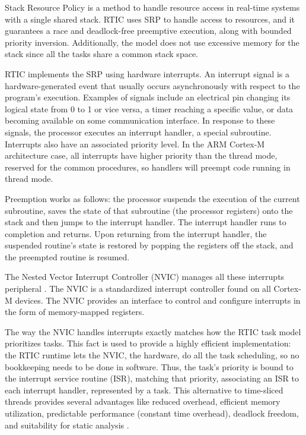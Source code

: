 Stack Resource Policy is a method to handle resource access in real-time systems with a single shared stack. RTIC uses SRP to handle access to resources, and it guarantees a race and deadlock-free preemptive execution, along with bounded priority inversion. Additionally, the model does not use excessive memory for the stack since all the tasks share a common stack space.

RTIC implements the SRP using hardware interrupts. An interrupt signal is a hardware-generated event that usually occurs asynchronously with respect to the program's execution. Examples of signals include an electrical pin changing its logical state from 0 to 1 or vice versa, a timer reaching a specific value, or data becoming available on some communication interface. In response to these signals, the processor executes an interrupt handler, a special subroutine. Interrupts also have an associated priority level. In the ARM Cortex-M architecture case, all interrupts have higher priority than the thread mode, reserved for the common procedures, so handlers will preempt code running in thread mode.

Preemption works as follows: the processor suspends the execution of the current subroutine, saves the state of that subroutine (the processor registers) onto the stack and then jumps to the interrupt handler. The interrupt handler runs to completion and returns. Upon returning from the interrupt handler, the suspended routine's state is restored by popping the registers off the stack, and the preempted routine is resumed.

The Nested Vector Interrupt Controller (NVIC) manages all these interrupts peripheral \cite{definitive-guide-cortex}. The NVIC is a standardized interrupt controller found on all Cortex-M devices. The NVIC provides an interface to control and configure interrupts in the form of memory-mapped registers.

The way the NVIC handles interrupts \cite{interrupts-handling} exactly matches how the RTIC task model prioritizes tasks. This fact is used to provide a highly efficient implementation: the RTIC runtime lets the NVIC, the hardware, do all the task scheduling, so no bookkeeping needs to be done in software. Thus, the task's priority is bound to the interrupt service routine (ISR), matching that priority, associating an ISR to each interrupt handler, represented by a task. This alternative to time-sliced threads provides several advantages like reduced overhead, efficient memory utilization, predictable performance (constant time overhead), deadlock freedom, and suitability for static analysis \cite{rtfm}.

